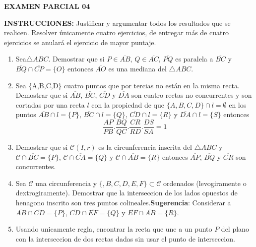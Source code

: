 \documentclass[12pts]{report}
\begin{document}
\begin{center}
\textbf{{\large EXAMEN PARCIAL 04}}
\end{center}

{\bf INSTRUCCIONES:} Justificar y argumentar todos los resultados que se realicen. Resolver únicamente cuatro ejercicios, de entregar más de cuatro ejercicios se anulará el ejercicio de mayor puntaje.


\begin{enumerate}

\item Sea$\triangle ABC$. Demostrar que si $P\in\overline{AB}$, $Q\in\overline{AC}$, $\overline{PQ}$ es paralela a $\overline{BC}$ y $\overline{BQ} \cap \overline{CP}=\{O\}$ entonces $\overline{AO}$ es una mediana del $\triangle ABC$.

\item Sea \{A,B,C,D\} cuatro puntos que por tercias no están en la misma recta. Demostrar que si $\overline{AB}$, $\overline{BC}$, $\overline{CD}$ y $\overline{DA}$ son cuatro rectas no concurrentes y son cortadas por una recta $l$ con la propiedad de que $\{A,B,C,D\}\cap l=\emptyset$ en los puntos $\overline{AB}\cap l=\{P\}$, $\overline{BC}\cap l=\{Q\}$, $\overline{CD}\cap l=\{R\}$ y $\overline{DA}\cap l=\{S\}$ entonces
$$\frac{AP}{PB}.\frac{BQ}{QC}.\frac{CR}{RD}.\frac{DS}{SA}=1$$

\item Demostrar que si $\mathcal{C}(I,r)$ es la circunferencia inscrita del $\triangle ABC$ y $\mathcal{C}\cap\overline{BC}=\{P\}$, $\mathcal{C}\cap\overline{CA}=\{Q\}$ y $\mathcal{C}\cap\overline{AB}=\{R\}$ entonces $\overline{AP}$, $\overline{BQ}$ y $\overline{CR}$ son concurrentes.

\item Sea $\mathcal{C}$ una circunferencia y $\{,B,C,D,E,F\}\subset \mathcal{C}$ ordenados (levogiramente o dextrogiramente). Demostrar que la interseccion de los lados opuestos de henagono inscrito son tres puntos colineales.\textbf{Sugerencia}: Considerar a $\overline{AB}\cap\overline{CD}=\{P\}$, $\overline{CD}\cap\overline{EF}=\{Q\}$ y $\overline{EF}\cap\overline{AB}=\{R\}$.

\item Usando unicamente regla, encontrar la recta que une a un punto $P$ del plano con la interseccion de dos rectas dadas sin usar el punto de interseccion.
\end{enumerate}
\end{document}
